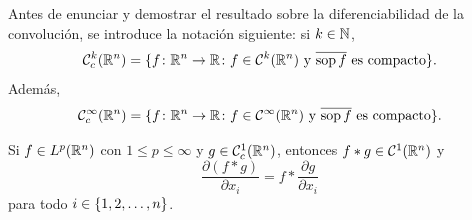 \documentclass[a4paper, 11pt, oneside]{report}
\begin{document}
Antes de enunciar y demostrar el resultado sobre la diferenciabilidad de la convolución, se introduce la notación siguiente: si $k \in \mathbb N$,
\[\mathcal{C}^k_c(\mathbb R^n) = \{f \colon \mathbb R^n \to \mathbb R \colon f \in \mathcal{C}^k(\mathbb R^n) \textup{ y } \overline{\textup{sop}\, f} \textup{ es compacto}\}.\]
Además,
\[\mathcal{C}^\infty_c(\mathbb R^n) = \{f \colon \mathbb R^n \to \mathbb R \colon f \in \mathcal{C}^\infty(\mathbb R^n) \textup{ y } \overline{\textup{sop}\, f} \textup{ es compacto}\}.\]

\begin{theorem}
  Si $f \in L^p(\mathbb R^n)$ con $1 \leq p \leq \infty$ y $g \in \mathcal{C}^1_c(\mathbb R^n)$, entonces $f \ast g \in \mathcal{C}^1(\mathbb R^n)$ y
  \[\frac{\partial (f \ast g)}{\partial x_i} = f \ast \frac{\partial g}{\partial x_i}\]
  para todo $i \in \{1,2,\mathellipsis,n\}$.
\end{theorem}
\end{document}
